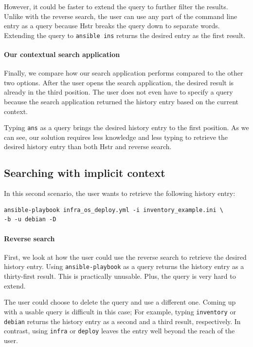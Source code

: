However, it could be faster to extend the query to further filter the results. Unlike with the reverse search, the user can use any part of the command line entry as a query because Hstr breaks the query down to separate words. Extending the query to \verb|ansible ins| returns the desired entry as the first result.


\paragraph{Our contextual search application}
Finally, we compare how our search application performs compared to the other two options.
After the user opens the search application, the desired result is already in the third position. The user does not even have to specify a query because the search application returned the history entry based on the current context.

Typing \verb|ans| as a query brings the desired history entry to the first position. As we can see, our solution requires less knowledge and less typing to retrieve the desired history entry than both Hstr and reverse search. 

\subsection{Searching with implicit context}

In this second scenario, the user wants to retrieve the following history entry:

\begin{verbatim}
ansible-playbook infra_os_deploy.yml -i inventory_example.ini \
-b -u debian -D
\end{verbatim}


\paragraph{Reverse search} 
First, we look at how the user could use the reverse search to retrieve the desired history entry.
Using \verb|ansible-playbook| as a query returns the history entry as a thirty-first result. This is practically unusable. Plus, the query is very hard to extend.

The user could choose to delete the query and use a different one. Coming up with a usable query is difficult in this case; For example, typing \verb|inventory| or \verb|debian| returns the history entry as a second and a third result, respectively. In contrast, using \verb|infra| or \verb|deploy| leaves the entry well beyond the reach of the user. 

